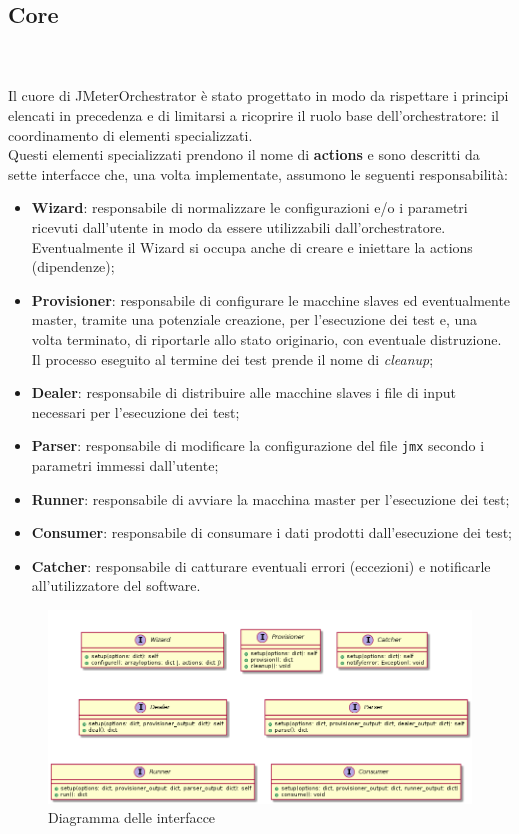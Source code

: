 \subsection{Core}
\\\\
Il cuore di JMeterOrchestrator è stato progettato in modo da rispettare i principi elencati in precedenza e di limitarsi a ricoprire il ruolo base dell'orchestratore: il coordinamento di elementi specializzati. \\
Questi elementi specializzati prendono il nome di \textbf{actions} e sono descritti da sette interfacce che, una volta implementate, assumono le seguenti responsabilità:
\begin{itemize}
	\item \textbf{Wizard}: responsabile di normalizzare le configurazioni e/o i parametri ricevuti dall'utente in modo da essere utilizzabili dall'orchestratore. Eventualmente il Wizard si occupa anche di creare e iniettare la actions (dipendenze);
	\item \textbf{Provisioner}: responsabile di configurare le macchine slaves ed eventualmente master, tramite una potenziale creazione, per l'esecuzione dei test e, una volta terminato, di riportarle allo stato originario, con eventuale distruzione. Il processo eseguito al termine dei test prende il nome di \textit{cleanup};
	\item \textbf{Dealer}: responsabile di distribuire alle macchine slaves i file di input necessari per l'esecuzione dei test;
	\item \textbf{Parser}: responsabile di modificare la configurazione del file \texttt{jmx} secondo i parametri immessi dall'utente;
	\item \textbf{Runner}: responsabile di avviare la macchina master per l'esecuzione dei test;
	\item \textbf{Consumer}: responsabile di consumare i dati prodotti dall'esecuzione dei test;
	\item \textbf{Catcher}: responsabile di catturare eventuali errori (eccezioni) e notificarle all'utilizzatore del software.
\end{itemize} 
\begin{figure}[H]
	\centering
	\includegraphics[width=13cm]{immagini/interfaces}
	\caption{Diagramma delle interfacce}
	\label{img-diagramma-interfacce}
\end{figure}
